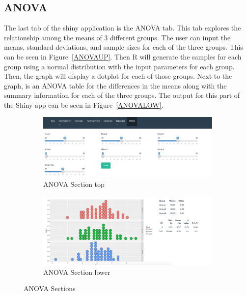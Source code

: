 \documentclass[11pt]{book}
\begin{document}
\subsection{ANOVA}

The last tab of the shiny application is the ANOVA tab.  This tab explores the relationship among the means of 3 different groups.  The user can input the means, standard deviations, and sample sizes for each of the three groups. This can be seen in Figure~\ref{ANOVAUP}. Then R will generate the samples for each group using a normal distribution with the input parameters for each group. Then, the graph will display a dotplot for each of those groups.  Next to the graph, is an ANOVA table for the differences in the means along with the summary information for each of the three groups. The output for this part of the Shiny app can be seen in Figure~\ref{ANOVALOW}.

\begin{figure}[H]
        \centering

        \begin{subfigure}[b]{0.75\textwidth}
                \includegraphics[width=\textwidth]{ANOVAUP.png}
                \caption{ANOVA Section top }
                \label{fig:ANOVALOW}
        \end{subfigure}%

        \begin{subfigure}[b]{0.75\textwidth}
                \includegraphics[width=\textwidth]{ANOVALOW.png}
                \caption{ANOVA Section lower} 
                \label{fig:ANOVALOW}
        \end{subfigure}

\caption {ANOVA Sections}
\end{figure}
\end{document}
